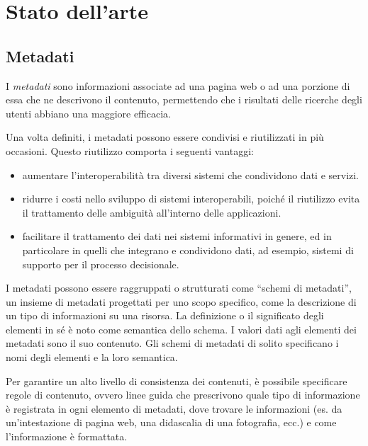 \clearpage{\pagestyle{empty}\cleardoublepage}
\lhead[\fancyplain{}{\bfseries\thepage}]{\fancyplain{}{\bfseries\rightmark}}
\chapter{Stato dell'arte}
\section{Metadati}
I \textit{metadati} sono informazioni associate ad una pagina web o ad una porzione di essa che ne descrivono il contenuto, permettendo che i risultati delle ricerche degli utenti abbiano una maggiore efficacia.

Una volta definiti, i metadati possono essere condivisi e riutilizzati in più occasioni. Questo riutilizzo comporta i seguenti vantaggi:
\begin{itemize}
\item aumentare l'interoperabilità tra diversi sistemi che condividono dati e servizi.
\item ridurre i costi nello sviluppo di sistemi interoperabili, poiché il riutilizzo evita il trattamento delle ambiguità all'interno delle applicazioni.
\item facilitare il trattamento dei dati nei sistemi informativi in genere, ed in particolare in quelli che integrano e condividono dati, ad esempio, sistemi di supporto per il processo decisionale.
\end{itemize}

I metadati possono essere raggruppati o strutturati come “schemi di metadati”, un insieme di metadati progettati per uno scopo specifico, come la descrizione di un tipo di informazioni su una risorsa. La definizione o il significato degli elementi in sé è noto come semantica dello schema. I valori dati agli elementi dei metadati sono il suo contenuto. Gli schemi di metadati di solito specificano i nomi degli elementi e la loro semantica.

Per garantire un alto livello di consistenza dei contenuti, è possibile specificare regole di contenuto, ovvero linee guida che prescrivono quale tipo di informazione è registrata in ogni elemento di metadati, dove trovare le informazioni (es. da un'intestazione di pagina web, una didascalia di una fotografia, ecc.) e come l'informazione è formattata. 

